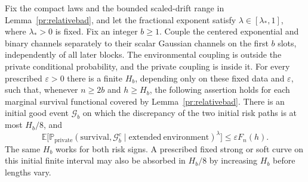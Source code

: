 \begin{lemma}
\label{pr:initial-coupling-block}
Fix the compact laws and the bounded scaled-drift range in
Lemma~\ref{pr:relativebad}, and let the fractional exponent satisfy
$\lambda\in[\lambda_*,1]$, where $\lambda_*>0$ is fixed. Fix an integer
$b\ge1$. Couple the centered
exponential and binary channels separately to their scalar Gaussian
channels on the first $b$ slots, independently of all later blocks.
The environmental coupling is outside the private conditional
probability, and the private coupling is inside it.
For every prescribed $\varepsilon>0$ there is a finite $H_b$, depending
only on these fixed data and $\varepsilon$, such that, whenever
$n\ge2b$ and $h\ge H_b$, the following assertion holds for each
marginal survival functional covered by Lemma~\ref{pr:relativebad}.
There is an initial good event $\mathcal G_b$ on which the discrepancy
of the two initial risk paths is at most $H_b/8$, and
\[
 \mathbb E\bigl[
   \mathbb P_{\mathrm{private}}
     (\mathrm{survival},\mathcal G_b^c
           \mid\mathrm{extended\ environment})^{\lambda}\bigr]
       \le \varepsilon F_n(h).
\]
The same $H_b$ works for both risk signs. A prescribed fixed strong or
soft curve on this initial finite interval may also be absorbed in
$H_b/8$ by increasing $H_b$ before lengths vary.
\end{lemma}
